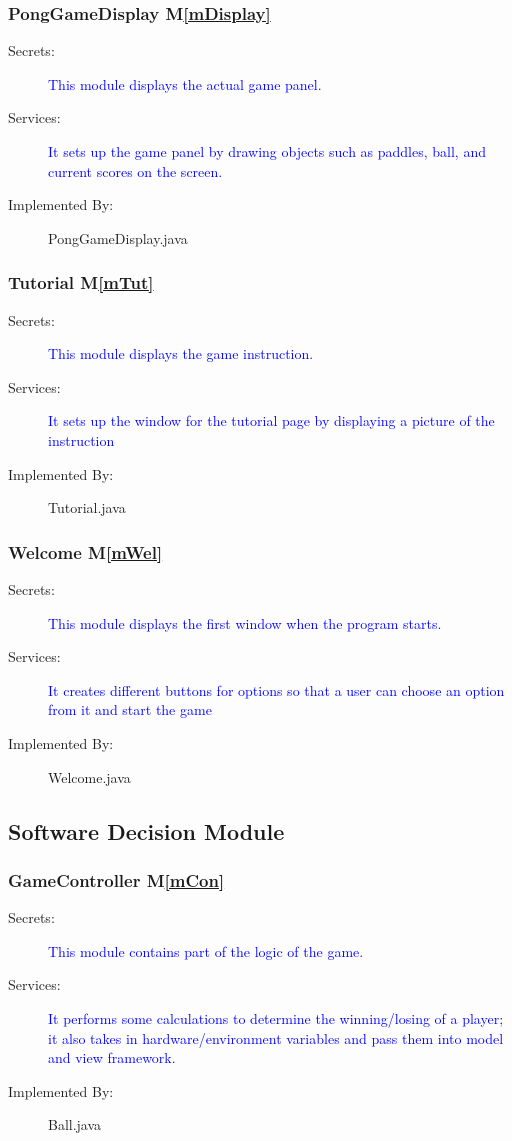 \documentclass[12pt,letterpaper]{article}
\begin{document}
	\subsubsection{PongGameDisplay M\ref{mDisplay}}
\begin{description} 
	\item[Secrets: ] \textcolor{blue}{This module displays the actual game panel.}
	\item[Services: ] \textcolor{blue} {It sets up the game panel by drawing objects such as paddles, ball, and current scores on the screen.}
	\item[Implemented By: ] PongGameDisplay.java
\end{description}
	\subsubsection{Tutorial M\ref{mTut}}
\begin{description} 
	\item[Secrets: ] \textcolor{blue}{This module displays the game instruction.}
	\item[Services: ] \textcolor{blue} {It sets up the window for the tutorial page by displaying a picture of the instruction}
	\item[Implemented By: ] Tutorial.java
\end{description}
	\subsubsection{Welcome M\ref{mWel}}
\begin{description} 
	\item[Secrets: ] \textcolor{blue}{This module displays the first window when the program starts.}
	\item[Services: ] \textcolor{blue} {It creates different buttons for options so that a user can choose an option from it and start the game}
	\item[Implemented By: ] Welcome.java
\end{description}
	\subsection{Software Decision Module}
	\subsubsection{GameController M\ref{mCon}}
\begin{description} 
	\item[Secrets: ] \textcolor{blue}{This module contains part of the logic of the game.}
	\item[Services: ] \textcolor{blue} {It performs some calculations to determine the winning/losing of a player; it also takes in hardware/environment variables and pass them into model and view framework.}
	\item[Implemented By: ] Ball.java
\end{description}
\end{document}
